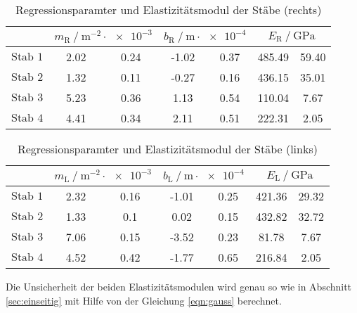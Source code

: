 \begin{table}
  \centering
  \caption{Regressionsparamter und Elastizitätsmodul der Stäbe (rechts)}
  \label{tab:regressiondouble}
  \begin{tabular} {S[table-format=3.0] 
    S[table-format=1.2] @{${}\pm{}$} S[table-format=1.2]
    S[table-format=1.2] @{${}\pm{}$} S[table-format=1.2]  
    S[table-format=3.2] @{${}\pm{}$} S[table-format=2.2]}
  \toprule
  &  & 
     & 
    \\
  \midrule
  {$\text{Stab 1}$}  & 2.02 & 0.24 & -1.02 & 0.37 & 485.49 & 59.40 \\
  {$\text{Stab 2}$}  & 1.32 & 0.11 & -0.27 & 0.16 & 436.15 & 35.01 \\
  {$\text{Stab 3}$}  & 5.23 & 0.36 & 1.13  & 0.54 & 110.04 & 7.67  \\ 
  {$\text{Stab 4}$}  & 4.41 & 0.34 & 2.11  & 0.51 & 222.31 & 2.05  \\
  \bottomrule
  \end{tabular}
\end{table}
\begin{table}
  \centering
  \caption{Regressionsparamter und Elastizitätsmodul der Stäbe (links)}
  \label{tab:regressiondoublelinks}
  \begin{tabular} {S[table-format=3.0]  
    S[table-format=1.2] @{${}\pm{}$} S[table-format=1.2]
    S[table-format=1.2] @{${}\pm{}$} S[table-format=1.2]
    S[table-format=3.2] @{${}\pm{}$} S[table-format=2.2]}
  \toprule
  &  & 
     &
    \\
  \midrule
  {$\text{Stab 1}$} & 2.32 & 0.16 & -1.01 & 0.25 & 421.36 & 29.32 \\
  {$\text{Stab 2}$} & 1.33 & 0.1  & 0.02  & 0.15 & 432.82 & 32.72\\
  {$\text{Stab 3}$} & 7.06 & 0.15 & -3.52 & 0.23 & 81.78  & 7.67  \\ 
  {$\text{Stab 4}$} & 4.52 & 0.42 & -1.77 & 0.65 & 216.84 & 2.05  \\
  \bottomrule
  \end{tabular}
\end{table}
Die Unsicherheit der beiden Elastizitätsmodulen wird genau so wie in Abschnitt \ref{sec:einseitig} mit Hilfe von der 
Gleichung \eqref{eqn:gauss} berechnet.